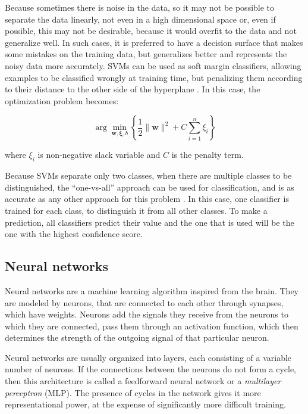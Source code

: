 Because sometimes there is noise in the data, so it may not be possible to separate the data linearly, not even in a high dimensional space or, even if possible, this may not be desirable, because it would overfit to the data and not generalize well. In such cases, it is preferred to have a decision surface that makes some mistakes on the training data, but generalizes better and represents the noisy data more accurately. SVMs can be used as soft margin classifiers, allowing examples to be classified wrongly at training time, but penalizing them according to their distance to the other side of the hyperplane \cite{russell1995artificial}. In this case, the optimization problem becomes: 

\[
\arg\min_{\mathbf{w},\mathbf{\xi}, b } \left\{\frac{1}{2} \|\mathbf{w}\|^2 + C \sum_{i=1}^n \xi_i \right\}
\]

where $ \xi_i $ is non-negative slack variable and $ C $ is the penalty term. 

Because SVMs separate only two classes, when there are multiple classes to be distinguished, the ``one-vs-all'' approach can be used for classification, and is as accurate as any other approach for this problem \cite{rifkin2004defense}. In this case, one classifier is trained for each class, to distinguish it from all other classes. To make a prediction, all classifiers predict their value and the one that is used will be the one with the highest confidence score.

\subsection{Neural networks}
Neural networks are a machine learning algorithm inspired from the brain. They are modeled by neurons, that are connected to each other through synapses, which have weights. Neurons add the signals they receive from the neurons to which they are connected, pass them through an activation function, which then determines the strength of the outgoing signal of that particular neuron. 

Neural networks are usually organized into layers, each consisting of a variable number of neurons. If the connections between the neurons do not form a cycle, then this architecture is called a feedforward neural network or a \textit{multilayer perceptron} (MLP). The presence of cycles in the network gives it more representational power, at the expense of significantly more difficult training. 


